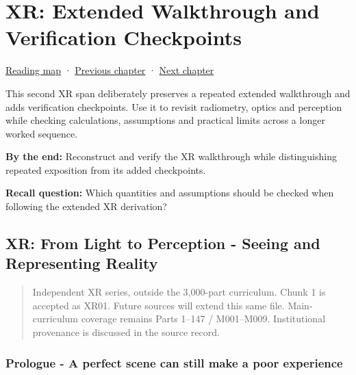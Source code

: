 \chapter{XR: Extended Walkthrough and Verification Checkpoints}\label{04-visual-computing-ii-ch043-xr-extended-walkthrough-and-verification-checkpoints}\hypertarget{04-visual-computing-ii-ch043}{}\label{stagechapter:04-visual-computing-ii-ch043}

\hypertarget{04-visual-computing-ii-ch043-xr-extended-walkthrough-and-verification-checkpoints}{}

\hyperref[volume-reading-map]{Reading map} · \hyperref[04-visual-computing-ii-ch042-xr-radiometry-optics-and-perception]{Previous chapter} · \hyperref[05-engine-i-ch008]{Next chapter}

This second XR span deliberately preserves a repeated extended walkthrough and adds verification checkpoints. Use it to revisit radiometry, optics and perception while checking calculations, assumptions and practical limits across a longer worked sequence.

\textbf{By the end:} Reconstruct and verify the XR walkthrough while distinguishing repeated exposition from its added checkpoints.

\textbf{Recall question:} Which quantities and assumptions should be checked when following the extended XR derivation?

\section{XR: From Light to Perception - Seeing and Representing Reality}\label{04-visual-computing-ii-ch043-xr-from-light-to-perception---seeing-and-representing-reality}

\hypertarget{04-visual-computing-ii-ch043-xr-from-light-to-perception---seeing-and-representing-reality}{}

\begin{quote}
Independent XR series, outside the 3,000-part curriculum. Chunk 1 is accepted as XR01. Future sources will extend this same file. Main-curriculum coverage remains Parts 1--147 / M001--M009. Institutional provenance is discussed in the source record.
\end{quote}

\subsection{Prologue - A perfect scene can still make a poor experience}\label{04-visual-computing-ii-ch043-prologue---a-perfect-scene-can-still-make-a-poor-experience}

